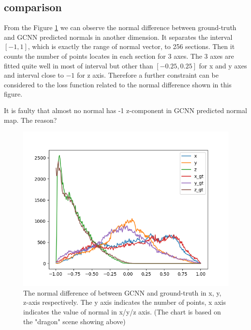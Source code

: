 \documentclass[border=15pt, multi, tikz]{article}
\begin{document}
\subsection{comparison}
From the Figure \ref{fig:normal-histo-diff} we can observe the normal difference between ground-truth and GCNN predicted normals in another dimension. It separates the interval $ \left[ -1,1 \right] $, which is exactly the range of normal vector, to 256 sections. Then it counts the number of points locates in each section for 3 axes.  The 3 axes are fitted quite well in most of interval but other than $ \left[ -0.25,0.25 \right] $ for x and y axes and  interval close to $ -1 $ for z axis. Therefore a further constraint can be considered to the loss function related to the normal difference shown in this figure.

It is faulty that almost no normal has -1 z-component in GCNN predicted normal map. The reason?
\begin{figure}[th]
	\centering
	\includegraphics[width=\linewidth]{./Figures/normal-histo-diff.png}
	\caption{The normal difference of between GCNN and ground-truth in x, y, z-axis respectively. The y axis indicates the number of points, x axis indicates the value of normal in x/y/z axis. (The chart is based on the "dragon" scene showing above)}
	\label{fig:normal-histo-diff}
\end{figure}
\end{document}
